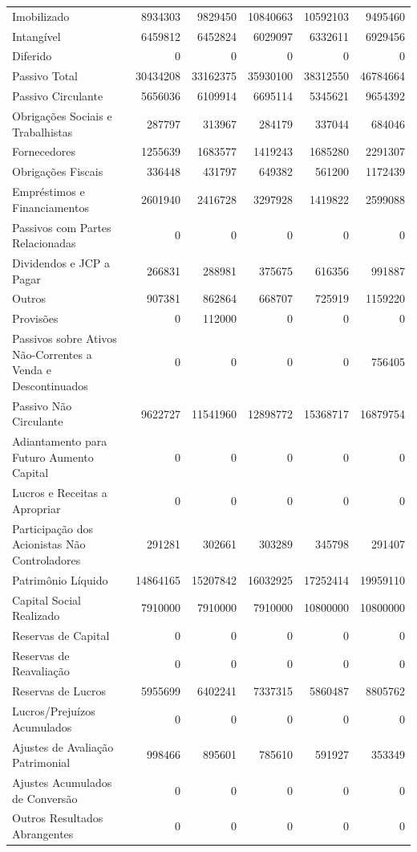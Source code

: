 \documentclass[grad,numbers]{coppe}
\begin{document}
\begin{longtable}[t]{lrrrrr}
  Imobilizado & 8934303 & 9829450 & 10840663 & 10592103 & 9495460\\
  Intangível & 6459812 & 6452824 & 6029097 & 6332611 & 6929456\\
  Diferido & 0 & 0 & 0 & 0 & 0\\
  \addlinespace
  Passivo Total & 30434208 & 33162375 & 35930100 & 38312550 & 46784664\\
  Passivo Circulante & 5656036 & 6109914 & 6695114 & 5345621 & 9654392\\
  Obrigações Sociais e Trabalhistas & 287797 & 313967 & 284179 & 337044 & 684046\\
  Fornecedores & 1255639 & 1683577 & 1419243 & 1685280 & 2291307\\
  Obrigações Fiscais & 336448 & 431797 & 649382 & 561200 & 1172439\\
  \addlinespace
  Empréstimos e Financiamentos & 2601940 & 2416728 & 3297928 & 1419822 & 2599088\\
  Passivos com Partes Relacionadas & 0 & 0 & 0 & 0 & 0\\
  Dividendos e JCP a Pagar & 266831 & 288981 & 375675 & 616356 & 991887\\
  Outros & 907381 & 862864 & 668707 & 725919 & 1159220\\
  Provisões & 0 & 112000 & 0 & 0 & 0\\
  \addlinespace
  Passivos sobre Ativos Não-Correntes a Venda e Descontinuados & 0 & 0 & 0 & 0 & 756405\\
  Passivo Não Circulante & 9622727 & 11541960 & 12898772 & 15368717 & 16879754\\
  Adiantamento para Futuro Aumento Capital & 0 & 0 & 0 & 0 & 0\\
  Lucros e Receitas a Apropriar & 0 & 0 & 0 & 0 & 0\\
  Participação dos Acionistas Não Controladores & 291281 & 302661 & 303289 & 345798 & 291407\\
  \addlinespace
  Patrimônio Líquido & 14864165 & 15207842 & 16032925 & 17252414 & 19959110\\
  Capital Social Realizado & 7910000 & 7910000 & 7910000 & 10800000 & 10800000\\
  Reservas de Capital & 0 & 0 & 0 & 0 & 0\\
  Reservas de Reavaliação & 0 & 0 & 0 & 0 & 0\\
  Reservas de Lucros & 5955699 & 6402241 & 7337315 & 5860487 & 8805762\\
  \addlinespace
  Lucros/Prejuízos Acumulados & 0 & 0 & 0 & 0 & 0\\
  Ajustes de Avaliação Patrimonial & 998466 & 895601 & 785610 & 591927 & 353349\\
  Ajustes Acumulados de Conversão & 0 & 0 & 0 & 0 & 0\\
  Outros Resultados Abrangentes & 0 & 0 & 0 & 0 & 0\\*
  \end{longtable}
  \endgroup{}
\end{document}
